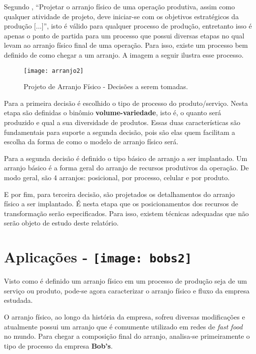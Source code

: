 		Segundo \cite{slack}, “Projetar o arranjo físico de uma operação produtiva, assim como qualquer atividade de projeto, deve iniciar-se com os objetivos estratégicos da produção [...]”, isto é válido para qualquer processo de produção, entretanto isso é apenas o ponto de partida para um processo que possui diversas etapas no qual levam ao arranjo físico final de uma operação. Para isso, existe um processo bem definido de como chegar a um arranjo. A imagem a seguir ilustra esse processo.

		\begin{figure}[h]
			\centering
			\texttt{[image: arranjo2]}
			\caption[Projeto de Arranjo Físico - Decisões a serem tomadas]{Projeto de Arranjo Físico - Decisões a serem tomadas. \cite{slack}}
			\label{fig:arranjo2}
		\end{figure}

		Para a primeira decisão é escolhido o tipo de processo do produto/serviço. Nesta etapa são definidas o binômio \textbf{volume-variedade}, isto é, o quanto será produzido e qual a sua diversidade de produtos. Essas duas características são fundamentais para suporte a segunda decisão, pois são elas quem facilitam a escolha da forma de como o modelo de arranjo físico será.

		Para a segunda decisão é definido o tipo básico de arranjo a ser implantado.  Um arranjo básico é a forma geral do arranjo de recursos produtivos da operação. De modo geral, são 4 arranjos: posicional, por processo, celular e por produto.

		E por fim, para terceira decisão, são projetados os detalhamentos do arranjo físico a ser implantado. É nesta etapa que os posicionamentos dos recursos de transformação serão especificados. Para isso, existem técnicas adequadas que não serão objeto de estudo deste relatório.

	\section[Aplicações]{Aplicações - \texttt{[image: bobs2]}}
	\label{sec:arranjo_aplicacoes}

		Visto como é definido um arranjo físico em um processo de produção seja de um serviço ou produto, pode-se agora caracterizar o arranjo físico e fluxo da empresa estudada. 

		O arranjo físico, ao longo da história da empresa, sofreu diversas modificações e atualmente possui um arranjo que é comumente utilizado em redes de \emph{fast food} no mundo. Para chegar a composição final do arranjo, analisa-se primeiramente o tipo de processo da empresa \textbf{Bob’s}.

